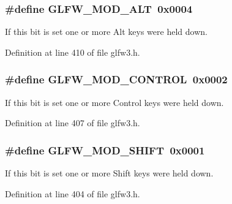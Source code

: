 \subsubsection[{G\+L\+F\+W\+\_\+\+M\+O\+D\+\_\+\+A\+L\+T}]{\setlength{\rightskip}{0pt plus 5cm}\#define G\+L\+F\+W\+\_\+\+M\+O\+D\+\_\+\+A\+L\+T~0x0004}\label{group__mods_gad2acd5633463c29e07008687ea73c0f4}


If this bit is set one or more Alt keys were held down. 



Definition at line 410 of file glfw3.\+h.

\hypertarget{group__mods_ga6ed94871c3208eefd85713fa929d45aa}{}
\subsubsection[{G\+L\+F\+W\+\_\+\+M\+O\+D\+\_\+\+C\+O\+N\+T\+R\+O\+L}]{\setlength{\rightskip}{0pt plus 5cm}\#define G\+L\+F\+W\+\_\+\+M\+O\+D\+\_\+\+C\+O\+N\+T\+R\+O\+L~0x0002}\label{group__mods_ga6ed94871c3208eefd85713fa929d45aa}


If this bit is set one or more Control keys were held down. 



Definition at line 407 of file glfw3.\+h.

\hypertarget{group__mods_ga14994d3196c290aaa347248e51740274}{}
\subsubsection[{G\+L\+F\+W\+\_\+\+M\+O\+D\+\_\+\+S\+H\+I\+F\+T}]{\setlength{\rightskip}{0pt plus 5cm}\#define G\+L\+F\+W\+\_\+\+M\+O\+D\+\_\+\+S\+H\+I\+F\+T~0x0001}\label{group__mods_ga14994d3196c290aaa347248e51740274}


If this bit is set one or more Shift keys were held down. 



Definition at line 404 of file glfw3.\+h.

